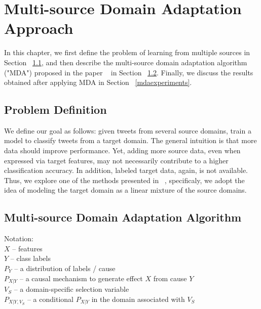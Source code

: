\cleardoublepage

\chapter{Multi-source Domain Adaptation Approach}
\label{mdachapter}

In this chapter, we first define the problem of learning from multiple sources in Section ~\ref{mdaproblemdefinitions}, and then describe the multi-source domain adaptation algorithm ("MDA") proposed in the paper ~\citep{mda} in Section ~\ref{mdaalg}. Finally, we discuss the results obtained after applying MDA in Section ~\ref{mdaexperiments}.


\section{Problem Definition}
\label{mdaproblemdefinitions}

We define our goal as follows: given tweets from several source domains, train a model to classify tweets from a target domain. The general intuition is that more data should improve performance. Yet, adding more source data, even when expressed via target features, may not necessarily contribute to a higher classification accuracy. In addition, labeled target data, again, is not available. Thus, we explore one of the methods presented in ~\citep{mda}, specificaly, we adopt the idea of modeling the target domain as a linear mixture of the source domains. 

\section{Multi-source Domain Adaptation Algorithm}
\label{mdaalg}

Notation: \\
$X$ -- features \\
$Y$ -- class labels \\
$P_Y$ -- a distribution of labels / cause \\
$P_{X|Y}$ -- a causal mechanism to generate effect $X$ from cause $Y$ \\
$V_S$ -- a domain-specific selection variable \\
$P_{X|Y, V_S}$ -- a conditional $P_{X|Y}$ in the domain associated with $V_S$

